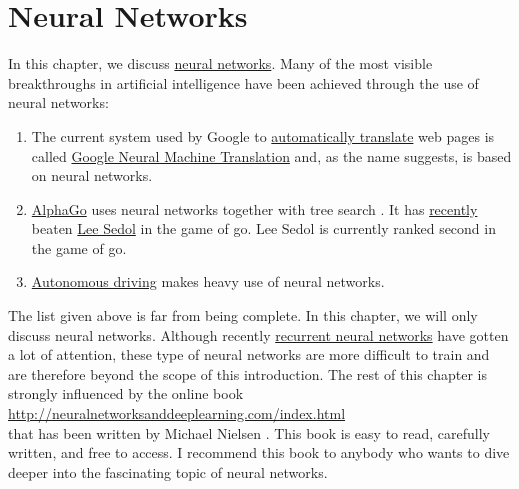 \chapter{Neural Networks}
In this chapter, we discuss \href{https://en.wikipedia.org/wiki/Artificial_neural_network}{neural networks}.
Many of the most visible breakthroughs in artificial intelligence have been achieved through the use of neural
networks: 
\begin{enumerate}
\item The current system used by Google to \href{https://translate.google.com}{automatically translate} web
      pages is called 
      \href{https://en.wikipedia.org/wiki/Google_Neural_Machine_Translation}{Google Neural Machine Translation} and,
      as the name suggests, is based on neural networks.  
\item \href{https://de.wikipedia.org/wiki/AlphaGo}{AlphaGo} uses neural networks together with tree search
      \cite{silver:2016}.  It has \href{https://en.wikipedia.org/wiki/AlphaGo_versus_Lee_Sedol}{recently} 
      beaten \href{https://en.wikipedia.org/wiki/Lee_Sedol}{Lee Sedol} in the game of go.  Lee Sedol is
      currently ranked second in the game of go. 
\item \href{https://en.wikipedia.org/wiki/Autonomous_car}{Autonomous driving} makes heavy use of neural networks.
\end{enumerate}
The list given above is far from being complete.  In this chapter, we will only discuss  
neural networks.  Although recently 
\href{https://en.wikipedia.org/wiki/Recurrent_neural_network}{recurrent neural networks} have gotten a lot of
attention, these type of neural networks are more difficult to train and are therefore beyond the scope of this
introduction.  The rest of this chapter is strongly influenced by the online book 
\\[0.2cm]
\hspace*{1.3cm}
\href{http://neuralnetworksanddeeplearning.com/index.html}{http://neuralnetworksanddeeplearning.com/index.html}
\\[0.2cm]
that has been written by Michael Nielsen \cite{nielsen:2015}.  This book is easy to read, carefully written, and
free to access.  I recommend this book to anybody who wants to dive deeper into the fascinating topic of neural
networks.

